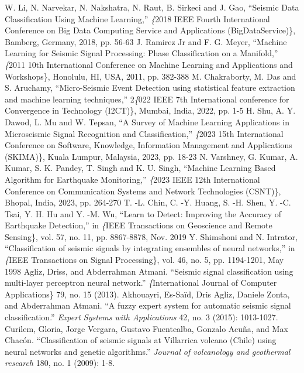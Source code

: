 \documentclass[conference]{IEEEtran}
\begin{document}
\begin{thebibliography}{00}
 W. Li, N. Narvekar, N. Nakshatra, N. Raut, B. Sirkeci and J. Gao,
``Seismic Data Classification Using Machine Learning,'' \textit\{2018 IEEE Fourth
International Conference on Big Data Computing Service and Applications
(BigDataService)\}, Bamberg, Germany, 2018, pp. 56-63  J. Ramirez Jr
and F. G. Meyer, ``Machine Learning for Seismic Signal Processing: Phase
Classification on a Manifold,'' \textit\{2011 10th International Conference on
Machine Learning and Applications and Workshops\}, Honolulu, HI, USA, 2011, pp.
382-388  M. Chakraborty, M. Das and S. Aruchamy, ``Micro-Seismic
Event Detection using statistical feature extraction and machine learning
techniques,'' 2\textit\{022 IEEE 7th International conference for Convergence in
Technology (I2CT)\}, Mumbai, India, 2022, pp. 1-5  H. Shu, A. Y.
Dawod, L. Mu and W. Tepsan, ``A Survey of Machine Learning Applications in
Microseismic Signal Recognition and Classification,'' \textit\{2023 15th
International Conference on Software, Knowledge, Information Management and
Applications (SKIMA)\}, Kuala Lumpur, Malaysia, 2023, pp. 18-23  N.
Varshney, G. Kumar, A. Kumar, S. K. Pandey, T. Singh and K. U. Singh, ``Machine
Learning Based Algorithm for Earthquake Monitoring,'' \textit\{2023 IEEE 12th
International Conference on Communication Systems and Network Technologies
(CSNT)\}, Bhopal, India, 2023, pp. 264-270  T. -L. Chin, C. -Y.
Huang, S. -H. Shen, Y. -C. Tsai, Y. H. Hu and Y. -M. Wu, ``Learn to Detect:
Improving the Accuracy of Earthquake Detection,'' in \textit\{IEEE Transactions on
Geoscience and Remote Sensing\}, vol. 57, no. 11, pp. 8867-8878, Nov. 2019
Y. Shimshoni and N. Intrator, ``Classification of seismic signals by
integrating ensembles of neural networks,'' in \textit\{IEEE Transactions on
Signal Processing\}, vol. 46, no. 5, pp. 1194-1201, May 1998 Agliz,
Driss, and Abderrahman Atmani. ``Seismic signal classification using multi-layer
perceptron neural network.'' \textit\{International Journal of Computer
Applications\} 79, no. 15 (2013). Akhouayri, Es-Saïd, Dris Agliz,
Daniele Zonta, and Abderrahman Atmani. ``A fuzzy expert system for automatic
seismic signal classification.'' \textit{Expert Systems with Applications} 42,
no. 3 (2015): 1013-1027. Curilem, Gloria, Jorge Vergara, Gustavo
Fuentealba, Gonzalo Acuña, and Max Chacón. ``Classification of seismic signals at
Villarrica volcano (Chile) using neural networks and genetic algorithms.''
\textit{Journal of volcanology and geothermal research} 180, no. 1 (2009): 1-8.
\end{thebibliography}
\end{document}
